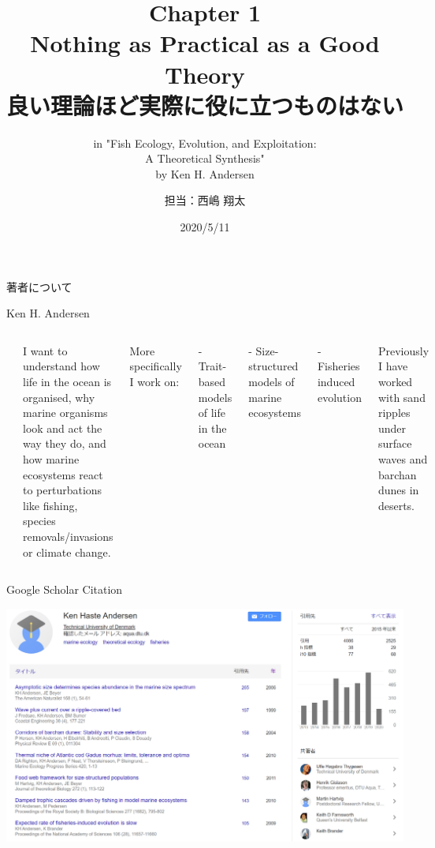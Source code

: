 \documentclass[
  ignorenonframetext,
]{beamer}
\title{Chapter 1\\
Nothing as Practical as a Good Theory\\
良い理論ほど実際に役に立つものはない}
\subtitle{in "Fish Ecology, Evolution, and Exploitation:\\
A Theoretical Synthesis"\\
by Ken H. Andersen}
\author{担当：西嶋 翔太}
\date{2020/5/11}
\begin{document}
\frame{\titlepage}

\begin{frame}{著者について}
\protect\hypertarget{ux8457ux8005ux306bux3064ux3044ux3066}{}

\begin{block}{Ken H. Andersen}

\begin{columns}


\includegraphics[width=100px]{KenAndersen} 


I want to understand how life in the ocean is organised, why marine organisms look and act the way they do, and how marine ecosystems react to perturbations like  fishing, species removals/invasions or climate change.  
  
\vspace{3mm}
More specifically I work on:  

- Trait-based models of life in the ocean  

- Size-structured models of marine ecosystems  

- Fisheries induced  evolution  
  
\vspace{3mm}
Previously I have worked with sand ripples under surface waves and barchan dunes in deserts.

\end{columns}

\end{block}

\end{frame}

\begin{frame}{Google Scholar Citation}
\protect\hypertarget{google-scholar-citation}{}

\includegraphics{GoogleScholarCitation.png}

\end{frame}
\end{document}
